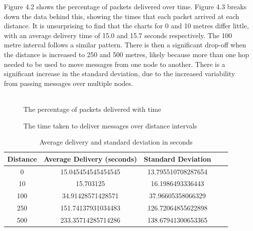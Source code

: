 \documentclass[12pt,a4paper]{report}
\begin{document}
{Figure 4.2 shows the percentage of packets delivered over time. Figure 4.3 breaks down the data behind this, showing the times that each packet arrived at each distance. It is unsurprising to find that the charts for 0 and 10 metres differ little, with an average delivery time of 15.0 and 15.7 seconds respectively. The 100 metre interval follows a similar pattern. There is then a significant drop-off when the distance is increased to 250 and 500 metres, likely because more than one hop needed to be used to move messages from one node to another. There is a significant increase in the standard deviation, due to the increased variability from passing messages over multiple nodes. \\ \\
\begin{figure}
\begin{center}

\end{center}
\caption{The percentage of packets delivered with time}
\end{figure}
\begin{figure}
\begin{center}

\end{center}
\caption{The time taken to deliver messages over distance intervals}
\end{figure}

\begin{table}
\begin{center}
\begin{tabular}{ |c|c|c|c|c| } 
\hline
Distance & Average Delivery (seconds) & Standard Deviation \\ 
\hline
0 & 15.045454545454545 & 13.795510708287654 \\ 
\hline
10 & 15.703125 & 16.1986493336443 \\ 
\hline
100 & 34.91428571428571 & 37.96605358066329 \\ 
\hline
250 & 151.74137931034483 & 126.72064855622898 \\ 
\hline
500 & 233.35714285714286 & 138.67941300653365 \\ 
\hline
\end{tabular}
\end{center}
\caption{Average delivery and standard deviation in seconds}
\end{table} 

\FloatBarrier

}
\end{document}
